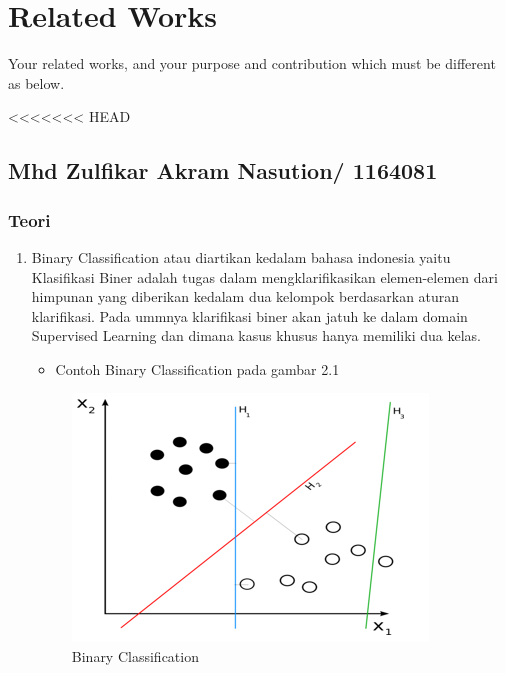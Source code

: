 \chapter{Related Works}

Your related works, and your purpose and contribution which must be different as below.

<<<<<<< HEAD
\section{Mhd Zulfikar Akram Nasution/ 1164081}
\subsection{Teori}
\begin{enumerate}
\item Binary Classification atau diartikan kedalam bahasa indonesia yaitu Klasifikasi Biner adalah tugas dalam mengklarifikasikan elemen-elemen dari himpunan yang diberikan kedalam dua kelompok berdasarkan aturan klarifikasi. Pada ummnya klarifikasi biner akan jatuh ke dalam domain Supervised Learning dan dimana kasus khusus hanya memiliki dua kelas.
\begin{itemize}
\item  Contoh Binary Classification pada gambar 2.1
\end{itemize}
\begin{figure}[ht]
\centering
\includegraphics[scale=0.9]{figures/zulfikar/1.png}
\caption{Binary Classification}
\end{figure}


\end{enumerate}
